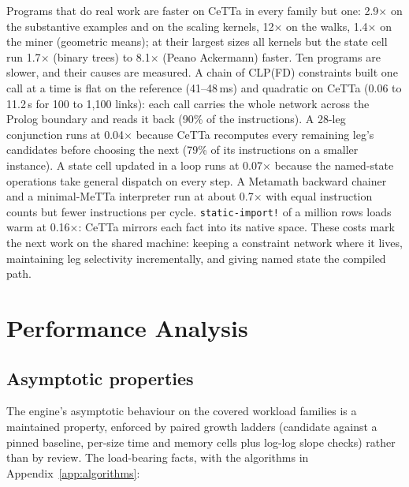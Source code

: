 \documentclass[11pt]{article}
\newcommand{\code}[1]{\texttt{#1}}
\newcommand{\CeTTa}{\textup{CeTTa}}
\begin{document}
Programs that do real work are faster on \CeTTa{} in every family but one:
2.9$\times$ on the substantive examples and on the scaling kernels, 12$\times$
on the walks, 1.4$\times$ on the miner (geometric means); at their largest
sizes all kernels but the state cell run 1.7$\times$ (binary trees) to
8.1$\times$ (Peano Ackermann) faster.  Ten programs are slower, and their causes are measured.  A
chain of CLP(FD) constraints built one call at a time is flat on the reference
(41--48\,ms) and quadratic on \CeTTa{} (0.06 to 11.2\,s for 100 to 1{,}100
links): each call carries the whole network across the Prolog boundary and
reads it back (90\% of the instructions).  A 28-leg conjunction runs at
0.04$\times$ because \CeTTa{} recomputes every remaining leg's candidates
before choosing the next (79\% of its instructions on a smaller instance).  A
state cell updated in a loop runs at 0.07$\times$ because the named-state
operations take general dispatch on every step.  A Metamath backward chainer
and a minimal-MeTTa interpreter run at about 0.7$\times$ with equal instruction
counts but fewer instructions per cycle.
\code{static-import!} of a million rows loads warm at 0.16$\times$: \CeTTa{}
mirrors each fact into its native space.  These costs mark the next work on
the shared machine: keeping a constraint network where it lives, maintaining
leg selectivity incrementally, and giving named state the compiled path.

\section{Performance Analysis}

\subsection{Asymptotic properties}

The engine's asymptotic behaviour on the covered workload families is a
maintained property, enforced by paired growth ladders (candidate
against a pinned baseline, per-size time and memory cells plus log-log
slope checks) rather than by review.  The load-bearing facts, with the
algorithms in Appendix~\ref{app:algorithms}:
\end{document}
